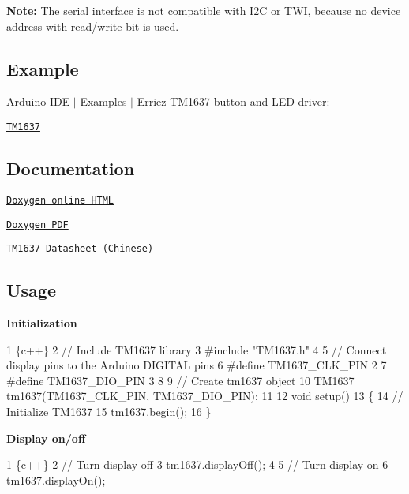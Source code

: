 {\bfseries Note\+:} The serial interface is not compatible with I2C or T\+WI, because no device address with read/write bit is used.

\subsection*{Example}

Arduino I\+DE $\vert$ Examples $\vert$ Erriez \hyperlink{class_t_m1637}{T\+M1637} button and L\+ED driver\+:

\href{https://github.com/Erriez/ErriezTM1637/blob/master/examples/TM1637/TM1637.ino}{\tt T\+M1637}

\subsection*{Documentation}


\begin{DoxyItemize}
\item \href{https://Erriez.github.io/ErriezTM1637}{\tt Doxygen online H\+T\+ML}
\item \href{https://github.com/Erriez/ErriezTM1637/raw/gh-pages/latex/ErriezTM1637.pdf}{\tt Doxygen P\+DF}
\item \href{https://github.com/Erriez/ErriezTM1637/blob/master/extras/TM1637_datasheet_chinese.pdf}{\tt T\+M1637 Datasheet (Chinese)}
\end{DoxyItemize}

\subsection*{Usage}

{\bfseries Initialization}


\begin{DoxyCode}
1 \{c++\}
2 // Include TM1637 library
3 #include "TM1637.h"
4 
5 // Connect display pins to the Arduino DIGITAL pins
6 #define TM1637\_CLK\_PIN   2
7 #define TM1637\_DIO\_PIN   3
8 
9 // Create tm1637 object
10 TM1637 tm1637(TM1637\_CLK\_PIN, TM1637\_DIO\_PIN);
11 
12 void setup()
13 \{
14     // Initialize TM1637
15     tm1637.begin();
16 \}
\end{DoxyCode}


{\bfseries Display on/off}


\begin{DoxyCode}
1 \{c++\}
2 // Turn display off
3 tm1637.displayOff();
4 
5 // Turn display on
6 tm1637.displayOn();
\end{DoxyCode}


